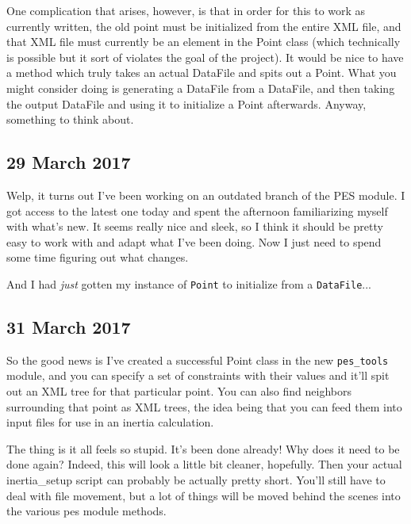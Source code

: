 One complication that arises, however, is that in order for this to work as currently written, the old point must be initialized from the entire XML file, and that XML file must currently be an element in the Point class (which technically is possible but it sort of violates the goal of the project). It would be nice to have a method which truly takes an actual DataFile and spits out a Point. What you might consider doing is generating a DataFile from a DataFile, and then taking the output DataFile and using it to initialize a Point afterwards. Anyway, something to think about.

\subsection*{29 March 2017}

Welp, it turns out I've been working on an outdated branch of the PES module. I got access to the latest one today and spent the afternoon familiarizing myself with what's new. It seems really nice and sleek, so I think it should be pretty easy to work with and adapt what I've been doing. Now I just need to spend some time figuring out what changes.

And I had \textit{just} gotten my instance of \texttt{Point} to initialize from a \texttt{DataFile}...

\subsection*{31 March 2017}

So the good news is I've created a successful Point class in the new \texttt{pes\_tools} module, and you can specify a set of constraints with their values and it'll spit out an XML tree for that particular point. You can also find neighbors surrounding that point as XML trees, the idea being that you can feed them into input files for use in an inertia calculation.

The thing is it all feels so stupid. It's been done already! Why does it need to be done again? Indeed, this will look a little bit cleaner, hopefully. Then your actual inertia\_setup script can probably be actually pretty short. You'll still have to deal with file movement, but a lot of things will be moved behind the scenes into the various pes module methods.

